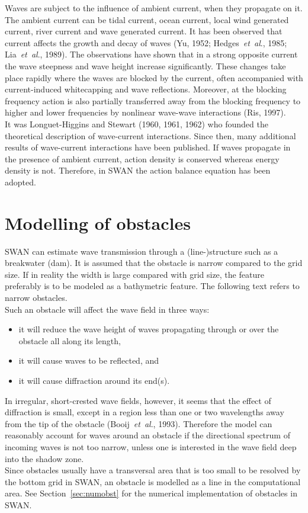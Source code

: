 \documentclass[12pt]{book}
\begin{document}
Waves are subject to the influence of ambient current, when they propagate on it. The ambient current
can be tidal current, ocean current, local wind generated current, river current and wave generated
current. It has been observed that current affects the growth and decay of waves (Yu, 1952;
Hedges~{\it et~al}., 1985; Lia~{\it et~al}., 1989). The observations have shown that in a strong opposite
current the wave steepness and wave height increase significantly. These changes take place rapidly
where the waves are blocked by the current, often accompanied with current-induced whitecapping and wave
reflections. Moreover, at the blocking frequency action is also partially transferred away from the blocking
frequency to higher and lower frequencies by nonlinear wave-wave interactions (Ris, 1997).
\\[2ex]
\noindent
It was Longuet-Higgins and Stewart (1960, 1961, 1962) who founded the theoretical description of wave-current
interactions. Since then, many additional results of wave-current interactions have been published. If waves
propagate in the presence of ambient current, action density is conserved whereas energy density is not.
Therefore, in SWAN the action balance equation has been adopted.

\section{Modelling of obstacles} \label{sec:obstac}

SWAN can estimate wave transmission through a (line-)structure such as a breakwater (dam).
It is assumed that the obstacle is narrow compared to the grid size.
If in reality the width is large compared with grid size,
the feature preferably is to be modeled as a bathymetric feature.
The following text refers to narrow obstacles.
\\[2ex]
\noindent
Such an obstacle will affect the wave field in three ways:
\begin{itemize}
  \item it will reduce the wave height of waves propagating through or over the obstacle all along its length,
  \item it will cause waves to be reflected, and
  \item it will cause diffraction around its end(s).
\end{itemize}
In irregular, short-crested wave fields, however, it seems that the effect of diffraction is small, except in a
region less than one or two wavelengths away from the tip of the obstacle (Booij~{\it et~al}., 1993). Therefore
the model can reasonably account for waves around an obstacle if the directional spectrum of incoming
waves is not too narrow, unless one is interested in the wave field deep into the shadow zone.
\\[2ex]
\noindent
Since obstacles usually have a transversal area that is too small to be resolved
by the bottom grid in SWAN, an obstacle is modelled as a line in the computational area. See Section~\ref{sec:numobst}
for the numerical implementation of obstacles in SWAN.
\end{document}
